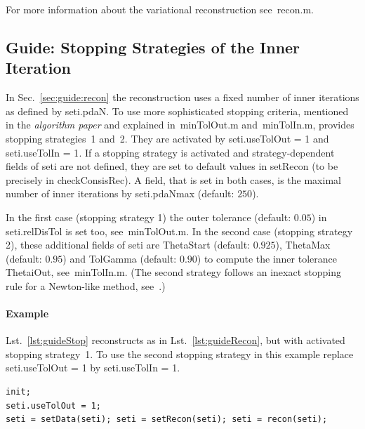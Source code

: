 \documentclass[a4paper]{article}
\begin{document}
For more information about the variational reconstruction see~\textsf{recon.m}.


\subsection{Guide: Stopping Strategies of the Inner Iteration}\label{sec:guide:stopping}

In Sec.~\ref{sec:guide:recon} the reconstruction uses a fixed number of inner iterations as defined by \textsf{seti.pdaN}. To use more sophisticated stopping criteria, mentioned in the \emph{algorithm paper} and explained in~\textsf{minTolOut.m} and~\textsf{minTolIn.m}, \IPscatt provides stopping strategies~1 and~2. They are activated by \textsf{seti.useTolOut = 1} and \textsf{seti.useTolIn = 1}.
If a stopping strategy is activated and strategy-dependent fields of \textsf{seti} are not defined, they are set to default values in \textsf{setRecon} (to be precisely in \textsf{checkConsisRec}). 
A field, that is set in both cases, is the maximal number of inner iterations by \textsf{seti.pdaNmax} (default: $250$).

In the first case (stopping strategy 1) the outer tolerance (default: $0.05$) in \textsf{seti.relDisTol} is set too, see~\textsf{minTolOut.m}.
%
In the second case (stopping strategy 2), these additional fields of \textsf{seti} are \textsf{ThetaStart} (default: $0.925$), \textsf{ThetaMax} (default: $0.95$) and \textsf{TolGamma} (default: $0.90$) to compute the inner tolerance \textsf{ThetaiOut}, see~\textsf{minTolIn.m}. (The second strategy follows an inexact stopping rule for a Newton-like method, see~\cite{Rieder2001}.)

\paragraph{Example} Lst.~\ref{lst:guideStop} reconstructs as in Lst.~\ref{lst:guideRecon}, but with activated stopping strategy~1. 
To use the second stopping strategy in this example replace \textsf{seti.useTolOut = 1} by \textsf{seti.useTolIn = 1}.

\begin{lstlisting}[caption={Variational reconstruction with stopping strategy 1 (\emph{source code}: \textsf{guides/guideStop.m}).},label=lst:guideStop]
init;
seti.useTolOut = 1;
seti = setData(seti); seti = setRecon(seti); seti = recon(seti);
\end{lstlisting}
\end{document}
